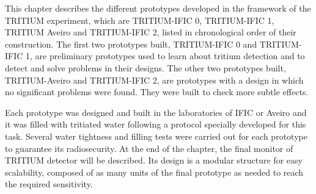 This chapter describes the different prototypes developed in the framework of the TRITIUM experiment, which are TRITIUM-IFIC 0, TRITIUM-IFIC 1, TRITIUM Aveiro and TRITIUM-IFIC 2, listed in chronological order of their construction. The first two prototypes built, TRITIUM-IFIC 0 and TRITIUM-IFIC 1, are preliminary prototypes used to learn about tritium detection and to detect and solve problems in their designs. The other two prototypes built, TRITIUM-Aveiro and TRITIUM-IFIC 2, are prototypes with a design in which no significant problems were found. They were built to check more subtle effects. 

Each prototype was designed and built in the laboratories of IFIC or Aveiro and it was filled with tritiated water following a protocol specially developed for this task. Several water tightness and filling tests were carried out for each prototype to guarantee its radiosecurity. At the end of the chapter, the final monitor of TRITIUM detector will be described. Its design is a modular structure for easy scalability, composed of as many units of the final prototype as needed to reach the required sensitivity.